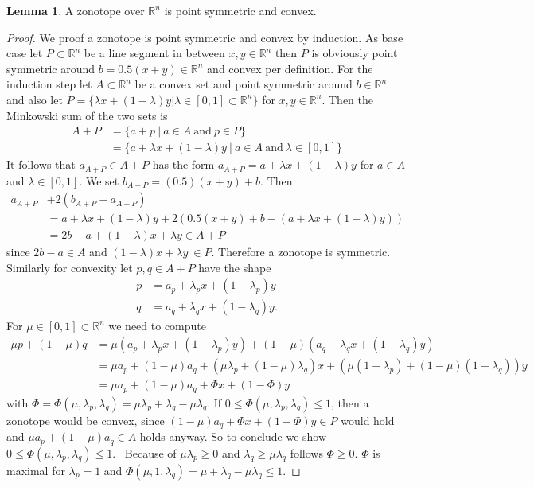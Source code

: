 \documentclass{article}
\theoremstyle{definition}
\newtheorem{lemma}[theorem]{Lemma}
\begin{document}
\begin{lemma}
\label{lem:zon_sym_conv}
A zonotope over $\mathbb{R}^{n}$ is point symmetric and convex.
\end{lemma}
\begin{proof}
We proof a zonotope is point symmetric and convex by induction. As base case let $P \subset \mathbb{R}^{n}$ be a line segment in between $x, y \in \mathbb{R}^{n}$ then $P$ is obviously point symmetric around $b=0.5(x+y) \in \mathbb{R}^{n}$ and convex per definition. For the induction step let $A \subset \mathbb{R}^{n}$ be a convex set and point symmetric around $b \in \mathbb{R}^{n}$ and also let $P = \{ \lambda x + (1- \lambda) y | \lambda \in [0,1] \subset \mathbb{R}^{n} \}$ for $x, y \in \mathbb{R}^{n}$. Then the Minkowski sum of the two sets is
\begin{align*}
A + P 
&= \{ a + p \ | \ a \in A \ \text{and} \ p \in P \} \\
&= \{ a + \lambda x + (1- \lambda) y \ | \ a \in A \ \text{and} \ \lambda \in [0,1] \}
\end{align*}
It follows that $a_{A+P} \in A+P$ has the form $a_{A+P}=a + \lambda x + (1- \lambda)y$ for $a\in A$ and $\lambda \in [0,1]$. We set $b_{A+P}=(0.5)(x+y) + b$. Then
\begin{align*}
a_{A+P} &+ 2(b_{A+P} - a_{A+P}) \\
&= a + \lambda x + (1- \lambda)y + 2( 0.5(x+y) + b - (a + \lambda x + (1-\lambda)y)) \\
&= 2b-a + (1- \lambda) x + \lambda y \in A+P
\end{align*}
since $2b-a \in A$ and $(1- \lambda) x + \lambda y \ \in P$. Therefore a zonotope is symmetric.
Similarly for convexity let $p, q \in A+P$ have the shape
\begin{align*}
p &= a_{p} + \lambda_{p} x + (1 - \lambda_{p}) y \\
q &= a_{q} + \lambda_{q} x + (1 - \lambda_{q}) y.
\end{align*}
For $\mu \in [0, 1] \subset \mathbb{R}^{n}$ we need to compute
\begin{align*}
\mu p + (1 - \mu) q &= \mu (a_{p} + \lambda_{p} x + (1-\lambda_{p}) y) + (1-\mu)(a_{q} + \lambda_{q} x + (1-\lambda_{q}) y) \\
&= \mu a_{p} + (1-\mu) a_{q} + (\mu \lambda_{p} + (1-\mu)\lambda_{q})x + (\mu(1-\lambda_{p}) + (1-\mu)(1-\lambda_{q}))y \\
&= \mu a_{p} + (1-\mu) a_{q} + \Phi x + (1- \Phi) y
\end{align*}
with $\Phi = \Phi(\mu , \lambda_{p}, \lambda_{q}) = \mu \lambda_{p} + \lambda_{q} - \mu \lambda_{q}$. If $0 \leq \Phi (\mu, \lambda_{p}, \lambda_{q}) \leq 1$, then a zonotope would be convex, since $(1-\mu) a_{q} + \Phi x + (1- \Phi) y \in P$ would hold and $\mu a_{p} + (1-\mu) a_{q} \in A$ holds anyway. So to conclude we show $0 \leq \Phi (\mu, \lambda_{p}, \lambda_{q}) \leq 1$. \
Because of $\mu \lambda_{p} \geq 0$ and $\lambda_{q} \geq \mu \lambda_{q}$ follows $\Phi \geq 0$. $\Phi$ is maximal for $\lambda_{p} = 1$ and $\Phi (\mu, 1, \lambda_{q}) = \mu + \lambda_{q} - \mu \lambda_{q} \leq 1$.
\end{proof}
\end{document}

